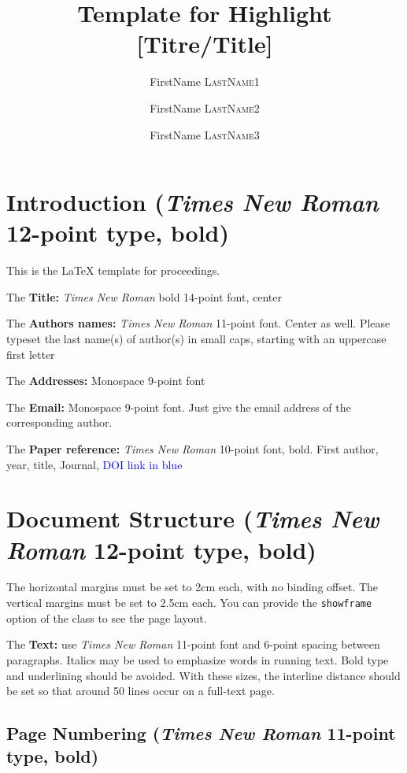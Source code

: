 \documentclass[highlight, final]{jobim2017}
\title{Template for \jobim2017 Highlight [Titre/Title]}
\author{FirstName \textsc{LastName1}\inst{1} \and FirstName \textsc{LastName2}\inst{2} \and FirstName \textsc{LastName3}\inst{2}}
\institute{
 Laboratory, Address, zip code, Town, Country
 \and
 Laboratory, Address, zip code, Town, Country 
}
\begin{document}

   \maketitle

 \section{Introduction (\emph{Times New Roman} 12-point type, bold)}
 \label{sec:introduction}

This is the {\LaTeX} template for  proceedings.

The \textbf{Title:} \emph{Times New Roman} bold 14-point font, center

The \textbf{Authors names:} \emph{Times New Roman} 11-point font. Center as
well. Please typeset the last name(s) of author(s) in small caps, starting
with an uppercase first letter

The \textbf{Addresses:} Monospace 9-point font

The \textbf{Email:} Monospace 9-point font. Just give the email address of the corresponding author.

The \textbf{Paper reference:} \emph{Times New Roman} 10-point font, bold. First author, year, title, Journal, \textcolor{blue}{DOI link in blue}

\section{Document Structure (\emph{Times New Roman} 12-point type, bold)}
\label{sec:doc-struct}

The horizontal margins must be set to 2cm each, with no binding offset. The
vertical margins must be set to 2.5cm each. You can provide the
\verb+showframe+ option of the \LaTeXe\space class to see the page layout.

The \textbf{Text:} use \emph{Times New Roman} 11-point font and 6-point spacing between paragraphs.
Italics may be used to emphasize words in running text. Bold type and underlining should be avoided.
With these sizes, the interline distance should be set so that around 50 lines occur on a full-text
page.


\subsection{Page Numbering (\emph{Times New Roman} 11-point type, bold)}
\label{sec:page-numbering}
\end{document}
